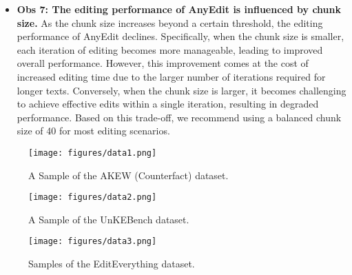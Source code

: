 \begin{itemize}[leftmargin=*]
    \item \textbf{Obs 7: The editing performance of AnyEdit is influenced by chunk size.}  
    As the chunk size increases beyond a certain threshold, the editing performance of AnyEdit declines. Specifically, when the chunk size is smaller, each iteration of editing becomes more manageable, leading to improved overall performance. However, this improvement comes at the cost of increased editing time due to the larger number of iterations required for longer texts. Conversely, when the chunk size is larger, it becomes challenging to achieve effective edits within a single iteration, resulting in degraded performance. Based on this trade-off, we recommend using a balanced chunk size of 40 for most editing scenarios.
\end{itemize}

\begin{figure}[h]
    \centering
    \texttt{[image: figures/data1.png]}
    \vspace{-5mm}
    \caption{A Sample of the AKEW (Counterfact) dataset.}
    \label{fig:sample1}
\end{figure}

\begin{figure}[h]
    \centering
    \texttt{[image: figures/data2.png]}
    \vspace{-5mm}
    \caption{A Sample of the UnKEBench dataset.}
    \label{fig:sample2}
\end{figure}

\begin{figure}[h]
    \centering
    \texttt{[image: figures/data3.png]}
    \vspace{-5mm}
    \caption{Samples of the EditEverything dataset.}
    \label{fig:sample3}
\end{figure}